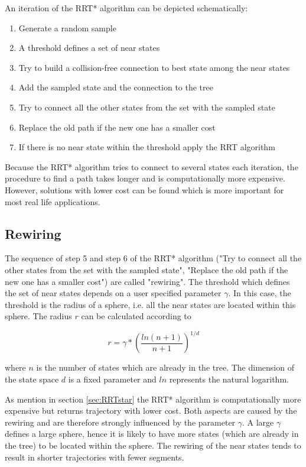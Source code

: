 An iteration of the RRT* algorithm can be depicted schematically:


\begin{enumerate}
  \item Generate a random sample
  \item A threshold defines a set of near states
  \item Try to build a collision-free connection to best state among the near states
  \item Add the sampled state and the connection to the tree 
  \item Try to connect all the other states from the set with the sampled state 
  \item Replace the old path if the new one has a smaller cost
  \item If there is no near state within the threshold apply the RRT algorithm
\end{enumerate}


Because the RRT* algorithm tries to connect to several states each iteration, the procedure to find a path takes longer and is computationally more expensive. However, solutions with lower cost can be found which is more important for most real life applications.

\subsection{Rewiring}

The sequence of step 5 and step 6 of the RRT* algorithm ("Try to connect all the other states from the set with the sampled state", "Replace the old path if the new one has a smaller cost") are called "rewiring". \newline 
The threshold which defines the set of near states depends on a user specified parameter $\gamma$. In this case, the threshold is the radius of a sphere, i.e. all the near states are located within this sphere. The radius $r$ can be calculated according to


\begin{equation}
r = \gamma * \left(\frac{ln(n+1)}{n+1}\right)^{1/d}
\label{equ:ballradius}
\end{equation}

where $n$ is the number of states which are already in the tree. The dimension of the state space $d$ is a fixed parameter and $ln$ represents the natural logarithm.\newline

As mention in section \ref{sec:RRTstar} the RRT* algorithm is computationally more expensive but returns trajectory with lower cost. Both aspects are caused by the rewiring and are therefore strongly influenced by the parameter $\gamma$. A large $\gamma$ defines a large sphere, hence it is likely to have more states (which are already in the tree) to be located within the sphere. The rewiring of the near states tends to result in shorter trajectories with fewer segments.

